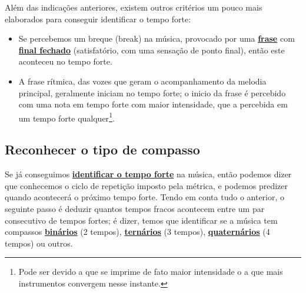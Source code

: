 Além das indicações anteriores, 
existem outros critérios um pouco mais elaborados para conseguir identificar o tempo forte:
\begin{itemize}
\item Se percebemos um breque (break) na música, 
provocado por uma \hyperref[sec:Frase]{\textbf{frase}} com \hyperref[subsec:FinalAbertoFechado]{\textbf{final fechado}} 
(satisfatório, com uma sensação de ponto final), então este aconteceu no tempo forte.
\item A frase rítmica, das vozes que geram o acompanhamento da melodia principal,
geralmente iniciam no tempo forte; 
o inicio da frase é percebido com uma nota em tempo forte com maior intensidade, 
que a percebida em um tempo forte qualquer\footnote{Pode ser
devido a que se imprime de fato maior intensidade o a que mais instrumentos convergem nesse instante.}.
\end{itemize}



\subsection{Reconhecer o tipo de compasso}
\label{subsec:pertipodecompasso}
Se já conseguimos \hyperref[subsec:perceberTF1]{\textbf{identificar o tempo forte}} na música,
então podemos dizer que conhecemos o ciclo de repetição imposto pela métrica,
e podemos predizer quando acontecerá o próximo tempo forte.
Tendo em conta tudo o anterior,
o seguinte passo é deduzir quantos tempos fracos acontecem 
entre um par consecutivo de tempos fortes;
é dizer, 
temos que identificar se a música tem compassos 
\hyperref[subsec:compassobinario]{\textbf{binários}} (2 tempos), 
\hyperref[subsec:compassoternario]{\textbf{ternários}} (3 tempos), 
\hyperref[subsec:compassoquaternario]{\textbf{quaternários}} (4 tempos) 
ou outros. 

